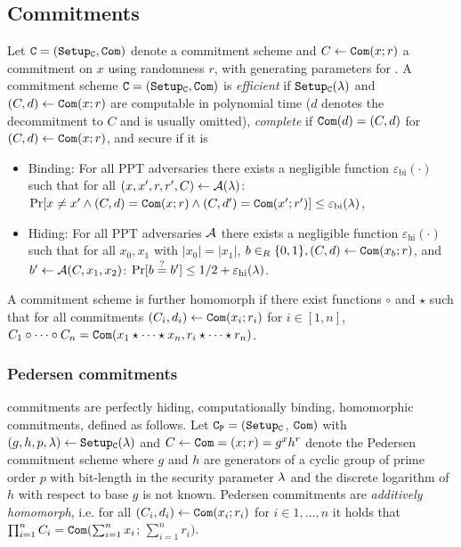 \subsection{Commitments} \label{sec:commitments}
Let $\mathtt{C}=(\mathtt{Setup_C},\mathtt{Com})$ denote a commitment scheme and $C\gets\mathtt{Com}(x;r)$ a commitment on $x$ using randomness $r$, with \SetupC generating parameters for \Commitment.
A commitment scheme $\mathtt{C}=(\mathtt{Setup_C},\mathtt{Com})$ is \emph{efficient} if $\mathtt{Setup_C}(\lambda)$ and $(C,d)\gets\mathtt{Com}(x;r)$ are computable in polynomial time ($d$ denotes the decommitment to $C$ and is usually omitted), \emph{complete} if $\mathtt{Com}(d)=(C,d)$ for $(C,d)\gets\mathtt{Com}(x;r)$, and secure if it is
\begin{itemize}
  \item Binding: For all \ac{PPT} adversaries \cA there exists a negligible function $\varepsilon_{\mathrm{bi}}(\cdot)$ such that for all $(x,x',r,r',C)\gets \mathcal{A}(\lambda)$:
    $\Pr[x\not=x'\wedge (C,d)=\mathtt{Com}(x;r)\wedge (C,d')=\mathtt{Com}(x';r')] \leq \varepsilon_{\mathrm{bi}}(\lambda)$,
  \item Hiding: For all \ac{PPT} adversaries $\mathcal{A}$ there exists a negligible function $\varepsilon_{\mathrm{hi}}(\cdot)$ such that for all $x_0,x_1$ with $|x_0|=|x_1|$, $b\in_R\{0,1\}, (C,d)\gets\mathtt{Com}(x_b;r)$, and $b'\gets \mathcal{A}(C,x_1,x_2)$:
    $\Pr[b\stackrel{?}{=} b'] \leq 1/2+\varepsilon_{\mathrm{hi}}(\lambda)$.
\end{itemize}

\noindent
A commitment scheme is further homomorph if there exist functions $\circ$ and $\star$ such that for all commitments $(C_i,d_i)\gets\mathtt{Com}(x_i;r_i)$  for $i\in[1,n]$, $C_1 \circ \cdots \circ C_n = \mathtt{Com}(x_1\star \cdots \star x_n, r_i\star \cdots \star r_n)$.

\subsubsection{Pedersen commitments}
\citet{Pedersen91} commitments are perfectly hiding, computationally binding, homomorphic commitments, defined as follows.
Let $\mathtt{C_P}=(\mathtt{Setup_C}$, $\mathtt{Com})$ with $(g,h,p,\lambda)\gets\mathtt{Setup_C}(\lambda)$ and $C\gets\mathtt{Com}=(x;r)=g^x h^r$ denote the Pedersen commitment scheme where $g$ and $h$ are generators of a cyclic group \GG of prime order $p$ with bit-length in the security parameter $\lambda$ and the discrete logarithm of $h$ with respect to base $g$ is not known.
Pedersen commitments are \emph{additively homomorph}, i.e. for all $(C_i,d_i) \gets \mathtt{Com}(x_i;r_i)$ for $i\in 1,\dots,n$ it holds that $\prod_{i=1}^{n}C_i=\mathtt{Com}(\sum_{i=1}^{n}x_i$; $\sum_{i=1}^{n}r_i)$.

